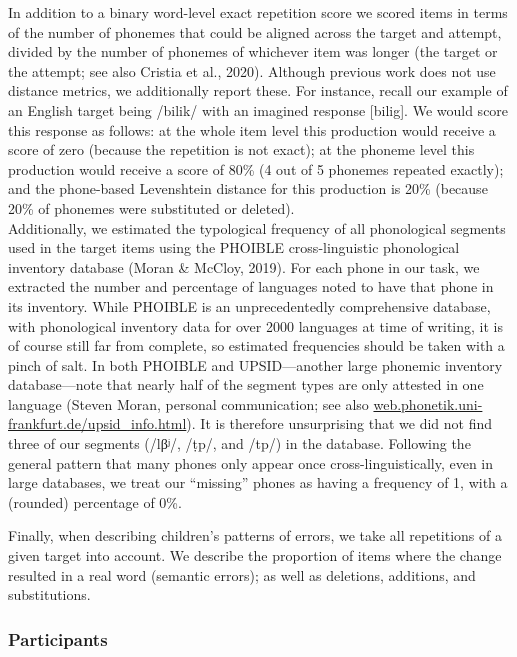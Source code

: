 \documentclass[english,,man,floatsintext]{apa6}
\begin{document}
In addition to a binary word-level exact repetition score we scored
items in terms of the number of phonemes that could be aligned across
the target and attempt, divided by the number of phonemes of whichever
item was longer (the target or the attempt; see also Cristia et al.,
2020). Although previous work does not use distance metrics, we
additionally report these. For instance, recall our example of an
English target being /bilik/ with an imagined response {[}bilig{]}. We
would score this response as follows: at the whole item level this
production would receive a score of zero (because the repetition is not
exact); at the phoneme level this production would receive a score of
80\% (4 out of 5 phonemes repeated exactly); and the phone-based
Levenshtein distance for this production is 20\% (because 20\% of
phonemes were substituted or deleted).\\

Additionally, we estimated the typological frequency of all phonological
segments used in the target items using the PHOIBLE cross-linguistic
phonological inventory database (Moran \& McCloy, 2019). For each phone
in our task, we extracted the number and percentage of languages noted
to have that phone in its inventory. While PHOIBLE is an unprecedentedly
comprehensive database, with phonological inventory data for over 2000
languages at time of writing, it is of course still far from complete,
so estimated frequencies should be taken with a pinch of salt. In both
PHOIBLE and UPSID---another large phonemic inventory database---note
that nearly half of the segment types are only attested in one language
(Steven Moran, personal communication; see also
\href{http://web.phonetik.uni-frankfurt.de/upsid_info.html}{web.phonetik.uni-frankfurt.de/upsid\_info.html}).
It is therefore unsurprising that we did not find three of our segments
(/lβʲ/, /ṭp/, and /tp/) in the database. Following the general pattern
that many phones only appear once cross-linguistically, even in large
databases, we treat our ``missing'' phones as having a frequency of 1,
with a (rounded) percentage of 0\%.

Finally, when describing children's patterns of errors, we take all
repetitions of a given target into account. We describe the proportion
of items where the change resulted in a real word (semantic errors); as
well as deletions, additions, and substitutions.

\subsubsection{Participants}\label{participants}
\end{document}
